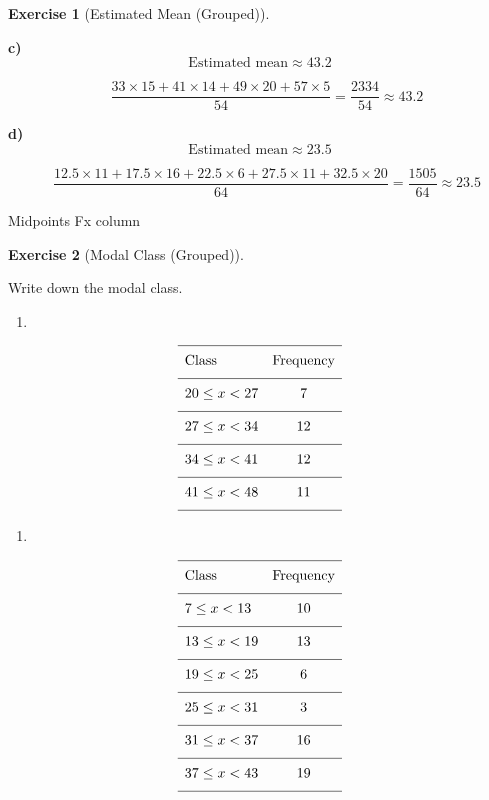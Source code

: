 \documentclass[
  letterpaper,
  DIV=11,
  numbers=noendperiod]{scrreprt}
\providecommand{\tightlist}{%
  \setlength{\itemsep}{0pt}\setlength{\parskip}{0pt}}
\theoremstyle{definition}
\newtheorem{exercise}{Exercise}[chapter]
\theoremstyle{remark}
\begin{document}
\begin{exercise}[Estimated Mean
(Grouped)]
\begin{tcolorbox}
\textbf{c)} \[\text{Estimated mean} \approx 43.2\]

\[\quad \frac{33\times15+41\times14+49\times20+57\times5}{54}= \frac{2334}{54} \approx 43.2\]

\textbf{d)} \[\text{Estimated mean} \approx 23.5\]

\[\quad \frac{12.5\times11+17.5\times16+22.5\times6+27.5\times11+32.5\times20}{64}= \frac{1505}{64} \approx 23.5\]

\end{tcolorbox}

{Midpoints} {Fx column}

\end{exercise}

\begin{exercise}[Modal Class
(Grouped)]\protect\hypertarget{exr-grp-2}{}\label{exr-grp-2}

Write down the modal class.

\begin{enumerate}
\def\labelenumi{\alph{enumi})}
\tightlist
\item
\end{enumerate}

\[{\renewcommand{\arraystretch}{1.6}\begin{array}{lc}
\hline \text{Class} & \text{Frequency} \\[4pt]
\hline 20 \leq x < 27  & 7 \\[4pt]
\hline 27 \leq x < 34  & 12 \\[4pt]
\hline 34 \leq x < 41  & 12 \\[4pt]
\hline 41 \leq x < 48  & 11 \\[4pt]
\hline \end{array}}\]

\begin{enumerate}
\def\labelenumi{\alph{enumi})}
\setcounter{enumi}{1}
\tightlist
\item
\end{enumerate}

\[{\renewcommand{\arraystretch}{1.6}\begin{array}{lc}
\hline \text{Class} & \text{Frequency} \\[4pt]
\hline 7 \leq x < 13  & 10 \\[4pt]
\hline 13 \leq x < 19  & 13 \\[4pt]
\hline 19 \leq x < 25  & 6 \\[4pt]
\hline 25 \leq x < 31  & 3 \\[4pt]
\hline 31 \leq x < 37  & 16 \\[4pt]
\hline 37 \leq x < 43  & 19 \\[4pt]
\hline \end{array}}\]


\end{exercise}
\end{document}
